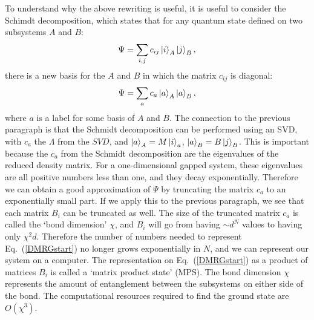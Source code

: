 To understand why the above rewriting is useful, it is useful to consider the Schimdt decomposition, which states that for any quantum state defined on two subsystems $A$ and $B$:
\begin{equation}
\Psi=\sum_{i,j}c_{ij}\ket{i}_A\ket{j}_B,
\end{equation}
there is a new basis for the $A$ and $B$ in which the matrix $c_{ij}$ is diagonal:
\begin{equation}
\Psi=\sum_{a}c_{a}\ket{a}_A\ket{a}_B,
\end{equation}
where $a$ is a label for some basis of $A$ and $B$. The connection to the previous paragraph is that the Schmidt decomposition can be performed using an SVD, with $c_a$ the $\Lambda$ from the $SVD$, and $\ket{a}_A=M\ket{i}_a$, $\ket{a}_B=B\ket{j}_B$. This is important because the $c_a$ from the Schmidt decomposition are the eigenvalues of the reduced density matrix. For a one-dimensional gapped system, these eigenvalues are all positive numbers less than one, and they decay exponentially. Therefore we can obtain a good approximation of $\Psi$ by truncating the matrix $c_a$ to an exponentially small part. If we apply this to the previous paragraph, we see that each matrix $B_i$ can be truncated as well. The size of the truncated matrix $c_a$ is called the `bond dimension' $\chi$, and $B_i$ will go from having $\sim d^N$ values to having only $\chi^2 d$. Therefore the number of numbers needed to represent Eq.~(\ref{DMRGstart}) no longer grows exponentially in $N$, and we can represent our system on a computer. The representation on Eq.~(\ref{DMRGstart}) as a product of matrices $B_i$ is called a `matrix product state' (MPS). The bond dimension $\chi$ represents the amount of entanglement between the subsystems on either side of the bond. The computational resources required to find the ground state are $O(\chi^3)$.

